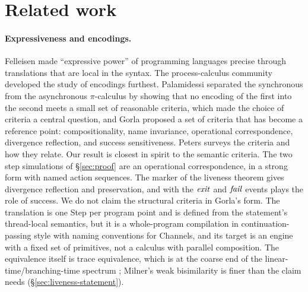 \section{Related work}
\label{sec:related}

\paragraph{Expressiveness and encodings.}
Felleisen \cite{felleisen1991expressive} made ``expressive power'' of
programming languages precise through translations that are local in the
syntax. The process-calculus community developed the study of encodings
furthest. Palamidessi \cite{palamidessi2003comparing} separated the
synchronous from the asynchronous $\pi$-calculus by showing that no
encoding of the first into the second meets a small set of reasonable
criteria, which made the choice of criteria a central question, and Gorla
\cite{gorla2010unified} proposed a set of criteria that has become a
reference point: compositionality, name invariance, operational
correspondence, divergence reflection, and success sensitiveness. Peters
\cite{peters2019comparing} surveys the criteria and how they relate. Our
result is closest in spirit to the semantic criteria. The two step
simulations of \S\ref{sec:proof} are an operational correspondence, in a
strong form with named action sequences. The \mdiv{} marker of the liveness
theorem gives divergence reflection and preservation, and \mterm{} with the
$\mathit{exit}$ and $\mathit{fail}$ events plays the role of success. We do not
claim the structural criteria in Gorla's form. The translation is one Step
per program point and is defined from the statement's thread-local semantics,
but it is a whole-program compilation in continuation-passing style
\cite{appel1992cps} with naming conventions for Channels, and its target is
an engine with a fixed set of primitives, not a calculus with parallel
composition. The equivalence itself is trace equivalence, which is at the
coarse end of the linear-time/branching-time spectrum
\cite{vanglabbeek2001spectrum}; Milner's weak bisimilarity
\cite{milner1989communication} is finer than the claim needs
(\S\ref{sec:liveness-statement}).

